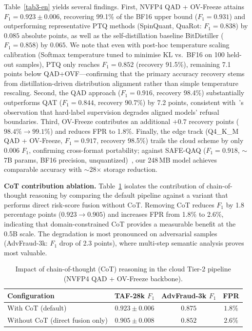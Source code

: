 \documentclass[11pt, a4paper]{article}
\begin{document}
Table~\ref{tab3-en} yields several findings. First, NVFP4 QAD + OV-Freeze attains $F_1 = 0.923 \pm 0.006$, recovering 99.1\% of the BF16 upper bound ($F_1 = 0.931$) and outperforming representative PTQ methods (SpinQuant, QuaRot: $F_1 = 0.838$) by $0.085$ absolute points, as well as the self-distillation baseline BitDistiller ($F_1 = 0.858$) by $0.065$. We note that even with post-hoc temperature scaling calibration (Softmax temperature tuned to minimise KL vs.\ BF16 on 100 held-out samples), PTQ only reaches $F_1 = 0.852$ (recovery 91.5\%), remaining 7.1 points below QAD+OVF---confirming that the primary accuracy recovery stems from distillation-driven distribution alignment rather than simple temperature rescaling. Second, the QAD approach ($F_1 = 0.916$, recovery 98.4\%) substantially outperforms QAT ($F_1 = 0.844$, recovery 90.7\%) by 7.2 points, consistent with~\cite{3}'s observation that hard-label supervision degrades aligned models' refusal boundaries. Third, OV-Freeze contributes an additional $+0.7$ recovery points ($98.4\%\!\rightarrow\!99.1\%$) and reduces FPR to 1.8\%. Finally, the edge track (Q4\_K\_M QAD + OV-Freeze, $F_1 = 0.917$, recovery 98.5\%) trails the cloud scheme by only 0.006 $F_1$, confirming cross-format portability; against SAFE-QAQ ($F_1 = 0.918$, $\sim$7B params, BF16 precision, unquantized)~\cite{2}, our 248\,MB model achieves comparable accuracy with $\sim$28$\times$ storage reduction.

\medskip
\noindent\textbf{CoT contribution ablation.} Table~\ref{tab:cot-ablation-en} isolates the contribution of chain-of-thought reasoning by comparing the default pipeline against a variant that performs direct risk-score fusion without CoT. Removing CoT reduces $F_1$ by 1.8 percentage points ($0.923\!\rightarrow\!0.905$) and increases FPR from 1.8\% to 2.6\%, indicating that domain-constrained CoT provides a measurable benefit at the 0.5B scale. The degradation is most pronounced on adversarial samples (AdvFraud-3k: $F_1$ drop of 2.3 points), where multi-step semantic analysis proves most valuable.

\begin{table}[htbp]
\centering
\caption{Impact of chain-of-thought (CoT) reasoning in the cloud Tier-2 pipeline (NVFP4 QAD + OV-Freeze backbone).}
\label{tab:cot-ablation-en}
\small
\renewcommand{\arraystretch}{1.2}
\begin{tabular}{lccc}
\toprule
\textbf{Configuration} & \textbf{TAF-28k $F_1$} & \textbf{AdvFraud-3k $F_1$} & \textbf{FPR} \\
\midrule
With CoT (default) & $\mathbf{0.923 \pm 0.006}$ & $\mathbf{0.875}$ & $\mathbf{1.8\%}$ \\
Without CoT (direct fusion only) & $0.905 \pm 0.008$ & $0.852$ & $2.6\%$ \\
\bottomrule
\end{tabular}
\end{table}
\end{document}
